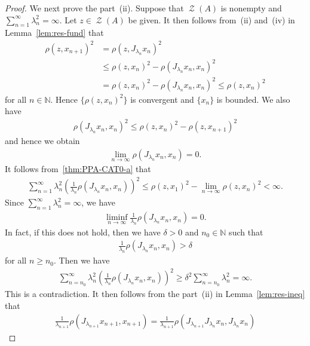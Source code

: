 \documentclass[draft]{amsart}
\numberwithin{equation}{section}
\def\N{\mathbb N}
\DeclareMathOperator{\Zer}{\mathcal{Z}}
\theoremstyle{plain}
\theoremstyle{definition}
\theoremstyle{remark}
\begin{document}
\begin{proof}
 We next prove the part~(ii). 
 Suppose that $\Zer (A)$ is nonempty and $\sum_{n=1}^{\infty}\lambda_n^2=\infty$. 
 Let $z\in \Zer (A)$ be given. It then follows from~(ii) and~(iv)  
 in Lemma~\ref{lem:res-fund} that 
 \begin{align*}
  \rho(z, x_{n+1})^2 
  &= \rho(z, J_{\lambda_n}x_n)^2 \\
  &\leq \rho(z, x_{n})^2 - \rho(J_{\lambda_n}x_n, x_n)^2 \\
  &= \rho(z, x_{n})^2 - \rho(J_{\lambda_n}x_n, x_n)^2 \leq \rho(z, x_{n})^2
 \end{align*}
 for all $n\in \N$. Hence $\bigl\{\rho(z, x_{n})^2\bigr\}$ is convergent 
 and $\{x_n\}$ is bounded. We also have 
 \begin{align}\label{thm:PPA-CAT0-a}
  \rho(J_{\lambda_n}x_{n}, x_n)^2 
  \leq \rho(z, x_{n})^2 - \rho(z, x_{n+1})^2
 \end{align}
 and hence we obtain 
 \begin{align}\label{thm:PPA-CAT0-b}
  \lim_{n\to \infty}\rho(J_{\lambda_n}x_{n}, x_{n})=0. 
 \end{align}
 It follows from~\eqref{thm:PPA-CAT0-a} that 
 \begin{align*}
  \sum_{n=1}^{\infty}\lambda_n^2 
  \left(\frac{1}{\lambda_n}\rho(J_{\lambda_n}x_{n}, x_n)\right)^2 
  \leq \rho(z, x_1)^2 - \lim_{n\to \infty}\rho(z, x_{n})^2 < \infty. 
 \end{align*}
 Since $\sum_{n=1}^{\infty}\lambda_n^2=\infty$, we have 
 \begin{align}\label{thm:PPA-CAT0-c}
  \liminf_{n\to \infty}\frac{1}{\lambda_n}\rho(J_{\lambda_n}x_{n}, x_n) = 0. 
 \end{align}
 In fact, if this does not hold, 
 then we have $\delta>0$ and $n_0\in \N$ such that 
 \begin{align*}
  \frac{1}{\lambda_n}\rho(J_{\lambda_n}x_{n}, x_n) > \delta 
 \end{align*}
 for all $n\geq n_0$. Then we have 
 \begin{align*}
  \sum_{n=n_0}^{\infty}\lambda_n^2 
  \left(\frac{1}{\lambda_n}\rho(J_{\lambda_n}x_{n}, x_n)\right)^2 
  \geq \delta^2 \sum_{n=n_0}^{\infty}\lambda_n^2 = \infty. 
 \end{align*}
 This is a contradiction. 
 It then follows from the part~(ii) in Lemma~\ref{lem:res-ineq} that 
 \begin{align*}
  \frac{1}{\lambda_{n+1}} \rho(J_{\lambda_{n+1}}x_{n+1}, x_{n+1})
  = \frac{1}{\lambda_{n+1}} 
  \rho(J_{\lambda_{n+1}}J_{\lambda_n}x_{n}, J_{\lambda_n}x_{n}) 

\end{align*}
\end{proof}
\end{document}
